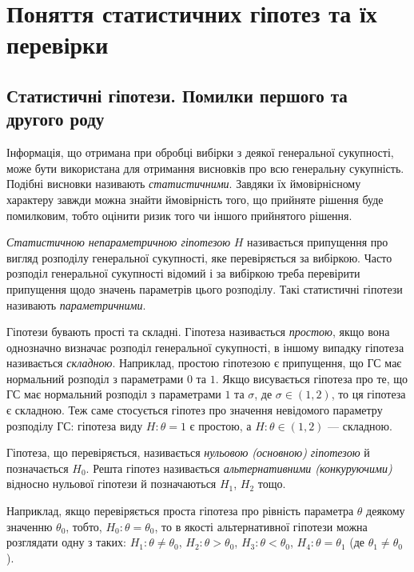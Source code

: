 \section{Поняття статистичних гіпотез та їх перевірки}
\subsection{Статистичні гіпотези. Помилки першого та другого роду}
Інформація, що отримана при обробці вибірки з деякої генеральної 
сукупності, може бути використана для отримання висновків про всю 
генеральну сукупність. Подібні висновки називають \emph{статистичними}. 
Завдяки їх ймовірнісному характеру завжди можна знайти ймовірність того, 
що прийняте рішення буде помилковим, тобто оцінити ризик того чи 
іншого прийнятого рішення.
\begin{definition}
    \emph{Статистичною непараметричною гіпотезою} $H$
    називається припущення про вигляд розподілу генеральної сукупності, яке 
    перевіряється за вибіркою. Часто розподіл генеральної сукупності відомий і за вибіркою треба 
    перевірити припущення щодо значень параметрів цього розподілу. Такі 
    статистичні гіпотези називають \emph{параметричними}. 
\end{definition}
Гіпотези бувають прості та складні. Гіпотеза називається \emph{простою}, 
якщо вона однозначно визначає розподіл генеральної сукупності, в 
іншому випадку гіпотеза називається \emph{складною}. Наприклад, простою 
гіпотезою є припущення, що ГС має нормальний розподіл з параметрами $0$ та $1$. 
Якщо висувається гіпотеза про те, що ГС має нормальний розподіл з параметрами $1$ та 
$\sigma$, де $\sigma \in (1, 2)$, то ця гіпотеза є складною. Теж саме стосується гіпотез про значення невідомого параметру розподілу ГС:
гіпотеза виду $H: \theta = 1$ є простою, а $H: \theta \in (1, 2)$ --- складною.
\begin{definition}
    Гіпотеза, що перевіряється, називається \emph{нульовою (основною) гіпотезою} й позначається $H_0$.
    Решта гіпотез називається \emph{альтернативними (конкуруючими)} відносно нульової гіпотези й позначаються
    $H_1$, $H_2$ тощо.
\end{definition}
Наприклад, якщо перевіряється проста гіпотеза про рівність параметра $\theta$ деякому значенню $\theta_0$,
тобто, $H_0 : \theta = \theta_0$, то в якості альтернативної гіпотези 
можна розглядати одну з таких: $H_1: \theta \neq \theta_0$, $H_2: \theta > \theta_0$,
$H_3: \theta < \theta_0$, $H_4: \theta = \theta_1$ (де $\theta_1 \neq \theta_0$).

